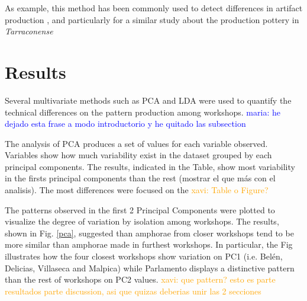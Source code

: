 \documentclass[review]{elsarticle}
\newcommand{\memo}[2]{\textcolor{#1}{#2}}
\newcommand{\xavi}[1]{\memo{orange}{xavi: #1\\}}
\newcommand{\maria}[1]{\memo{blue}{maria: #1\\}}
\begin{document}
As example, this method has been commonly used to detect differences in  artifact production \citep{charlton_investigating_2012, thorpe_distribution_1984}, and particularly for a similar study about the production pottery in \emph{Tarraconense} \citep{i_martin_alisis_1998}



\section{Results}

Several multivariate methods such as PCA and LDA were used to quantify the technical differences on the pattern production among workshops. 
\maria{he dejado esta frase a modo introductorio y he quitado las subsection} 

The analysis of PCA produces a set of values for each variable observed. Variables show how much variability exist in the dataset grouped by each principal components. The results, indicated in the Table, show most variability in the firsts principal components than the rest (mostrar el que más con el analisis).
The most differences were focused on the %
\xavi{Table o Figure?}

    

The patterns observed in the first 2 Principal Components were plotted to visualize the degree of variation by isolation among workshops. The results, shown in Fig. \ref{pca}, suggested than amphorae from closer workshops tend to be more similar than amphorae made in furthest workshops. In particular, the Fig illustrates how the four closest workshops show variation on PC1 (i.e. Bel\'en, Delicias, Villaseca and Malpica) while Parlamento displays a distinctive pattern than the rest of workshops on PC2 values. 
\xavi{que pattern? esto es parte resultados parte discussion, asi que quizas deberias unir las 2 secciones}
\end{document}

